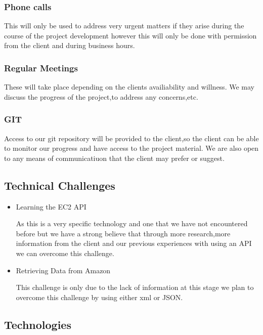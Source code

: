 \documentclass{scrartcl}
\begin{document}
\subsubsection{Phone calls}
This will only be used to address very urgent matters if they arise during the course of the project development
however this will only be done with permission from the client and during business hours.
\subsubsection{Regular Meetings}
These will take place depending on the clients availiability and willness.
We may discuss the progress of the project,to address any concerns,etc.
\subsubsection{GIT}
Access to our git repository will be provided to the client,so the client can be able to monitor
our progress and have access to the project material.
We are also open to any means of communicatiuon that the client may prefer or suggest.
\subsection{Technical Challenges}
\begin{itemize}
\item Learning the EC2 API 

As this is a very specific technology and one that we have not encountered before but we have a strong believe that 
through more research,more information from the client and our previous experiences with using an API we can overcome this challenge.

\item Retrieving Data from Amazon

This challenge is only due to the lack of information at this stage we plan to overcome this challenge by using either xml or JSON.
\end{itemize}
\subsection{Technologies}
\end{document}
